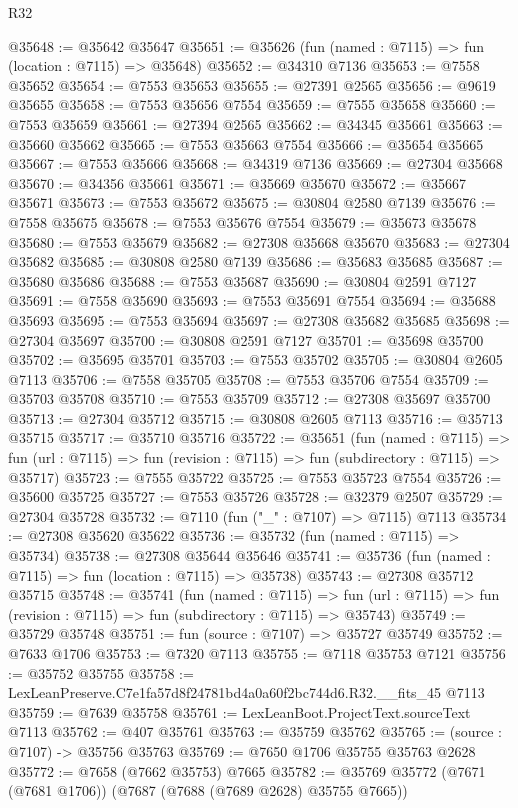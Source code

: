 \begin{lexlean}{R32}
\begin{coremodule}
@35648 := @35642 @35647
@35651 := @35626 (fun (named : @7115) => fun (location : @7115) => @35648)
@35652 := @34310 @7136
@35653 := @7558 @35652
@35654 := @7553 @35653
@35655 := @27391 @2565
@35656 := @9619 @35655
@35658 := @7553 @35656 @7554
@35659 := @7555 @35658
@35660 := @7553 @35659
@35661 := @27394 @2565
@35662 := @34345 @35661
@35663 := @35660 @35662
@35665 := @7553 @35663 @7554
@35666 := @35654 @35665
@35667 := @7553 @35666
@35668 := @34319 @7136
@35669 := @27304 @35668
@35670 := @34356 @35661
@35671 := @35669 @35670
@35672 := @35667 @35671
@35673 := @7553 @35672
@35675 := @30804 @2580 @7139
@35676 := @7558 @35675
@35678 := @7553 @35676 @7554
@35679 := @35673 @35678
@35680 := @7553 @35679
@35682 := @27308 @35668 @35670
@35683 := @27304 @35682
@35685 := @30808 @2580 @7139
@35686 := @35683 @35685
@35687 := @35680 @35686
@35688 := @7553 @35687
@35690 := @30804 @2591 @7127
@35691 := @7558 @35690
@35693 := @7553 @35691 @7554
@35694 := @35688 @35693
@35695 := @7553 @35694
@35697 := @27308 @35682 @35685
@35698 := @27304 @35697
@35700 := @30808 @2591 @7127
@35701 := @35698 @35700
@35702 := @35695 @35701
@35703 := @7553 @35702
@35705 := @30804 @2605 @7113
@35706 := @7558 @35705
@35708 := @7553 @35706 @7554
@35709 := @35703 @35708
@35710 := @7553 @35709
@35712 := @27308 @35697 @35700
@35713 := @27304 @35712
@35715 := @30808 @2605 @7113
@35716 := @35713 @35715
@35717 := @35710 @35716
@35722 := @35651
    (fun (named : @7115) =>
    fun (url : @7115) => fun (revision : @7115) => fun (subdirectory : @7115) => @35717)
@35723 := @7555 @35722
@35725 := @7553 @35723 @7554
@35726 := @35600 @35725
@35727 := @7553 @35726
@35728 := @32379 @2507
@35729 := @27304 @35728
@35732 := @7110 (fun ("_" : @7107) => @7115) @7113
@35734 := @27308 @35620 @35622
@35736 := @35732 (fun (named : @7115) => @35734)
@35738 := @27308 @35644 @35646
@35741 := @35736 (fun (named : @7115) => fun (location : @7115) => @35738)
@35743 := @27308 @35712 @35715
@35748 := @35741
    (fun (named : @7115) =>
    fun (url : @7115) => fun (revision : @7115) => fun (subdirectory : @7115) => @35743)
@35749 := @35729 @35748
@35751 := fun (source : @7107) => @35727 @35749
@35752 := @7633 @1706
@35753 := @7320 @7113
@35755 := @7118 @35753 @7121
@35756 := @35752 @35755
@35758 := LexLeanPreserve.C7e1fa57d8f24781bd4a0a60f2bc744d6.R32.__fits_45 @7113
@35759 := @7639 @35758
@35761 := LexLeanBoot.ProjectText.sourceText @7113
@35762 := @407 @35761
@35763 := @35759 @35762
@35765 := (source : @7107) -> @35756 @35763
@35769 := @7650 @1706 @35755 @35763 @2628
@35772 := @7658 (@7662 @35753) @7665
@35782 := @35769 @35772 (@7671 (@7681 @1706)) (@7687 (@7688 (@7689 @2628) @35755 @7665))

\end{coremodule}
\end{lexlean}
